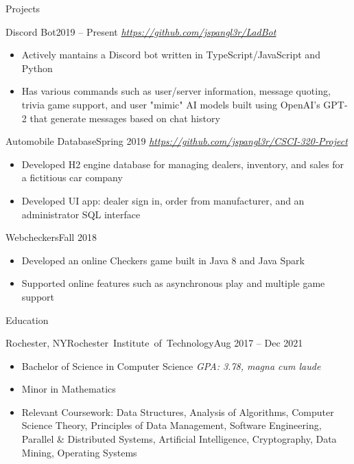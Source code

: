 \documentclass[]{mcdowellcv}
\begin{document}
	\begin{cvsection}{Projects}
		\begin{cvsubsection}{Discord Bot}{}{2019 -- Present}
			\textit{\url{https://github.com/jspangl3r/LadBot}}
			\begin{itemize}
				\item Actively mantains a Discord bot written in TypeScript/JavaScript and Python
				\item Has various commands such as user/server information, message quoting, trivia game support, and user "mimic" AI models built using OpenAI's GPT-2 that generate messages based on chat history
			\end{itemize}
		\end{cvsubsection}

		\begin{cvsubsection}{Automobile Database}{}{Spring 2019}
			\textit{\url{https://github.com/jspangl3r/CSCI-320-Project}}
			\begin{itemize}
				\item Developed H2 engine database for managing dealers, inventory, and sales for a fictitious car company
				\item Developed UI app: dealer sign in, order from manufacturer, and an administrator SQL interface
			\end{itemize}
		\end{cvsubsection}

		\begin{cvsubsection}{Webcheckers}{}{Fall 2018}
			\begin{itemize}
				\item Developed an online Checkers game built in Java 8 and Java Spark
				\item Supported online features such as asynchronous play and multiple game support
			\end{itemize}
		\end{cvsubsection}
	\end{cvsection}

	\begin{cvsection}{Education}
		\begin{cvsubsection}{Rochester, NY}{\mbox{Rochester Institute of Technology}}{Aug 2017 -- Dec 2021}
			\begin{itemize}
				\item Bachelor of Science in Computer Science \hfill \textit{GPA: 3.78, magna cum laude}
				\item Minor in Mathematics
				\item Relevant Coursework: Data Structures, Analysis of Algorithms, Computer Science Theory, Principles of Data Management, Software Engineering, Parallel \& Distributed Systems, Artificial Intelligence, 
				Cryptography, Data Mining, Operating Systems
			\end{itemize}
		\end{cvsubsection}
	\end{cvsection}
	
\end{document}
